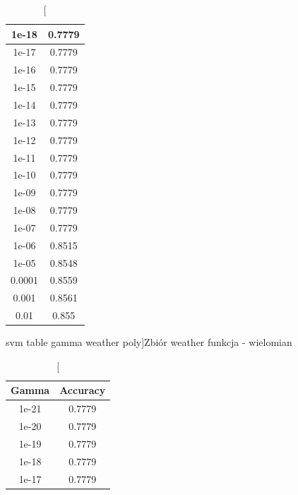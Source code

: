 \documentclass{classrep}
\begin{document}
{{\begin{table}[!htbp]
\begin{minipage}{.35\textwidth}
\begin{tabular}{|c|c|}
                        1e-18 & 0.7779 \\ \hline
                        1e-17 & 0.7779 \\ \hline
                        1e-16 & 0.7779 \\ \hline
                        1e-15 & 0.7779 \\ \hline
                        1e-14 & 0.7779 \\ \hline
                        1e-13 & 0.7779 \\ \hline
                        1e-12 & 0.7779 \\ \hline
                        1e-11 & 0.7779 \\ \hline
                        1e-10 & 0.7779 \\ \hline
                        1e-09 & 0.7779 \\ \hline
                        1e-08 & 0.7779 \\ \hline
                        1e-07 & 0.7779 \\ \hline
                        1e-06 & 0.8515 \\ \hline
                        1e-05 & 0.8548 \\ \hline
                        0.0001 & 0.8559 \\ \hline
                        0.001 & 0.8561 \\ \hline
                        0.01 & 0.855 \\ \hline
                    \end{tabular}
                    \caption
                    [svm table gamma weather poly]{Zbiór weather funkcja - wielomian}
                    \label{svn_table_gamma_weather_poly}
                \end{minipage}
                \hfill
                \begin{minipage}{.3\textwidth}
                    \centering
                    \begin{tabular}{|c|c|}
                        \hline
                        Gamma & Accuracy \\ \hline
                        1e-21 & 0.7779 \\ \hline
                        1e-20 & 0.7779 \\ \hline
                        1e-19 & 0.7779 \\ \hline
                        1e-18 & 0.7779 \\ \hline
                        1e-17 & 0.7779 \\ \hline

\end{tabular}
\end{minipage}
\end{table}}}
\end{document}
